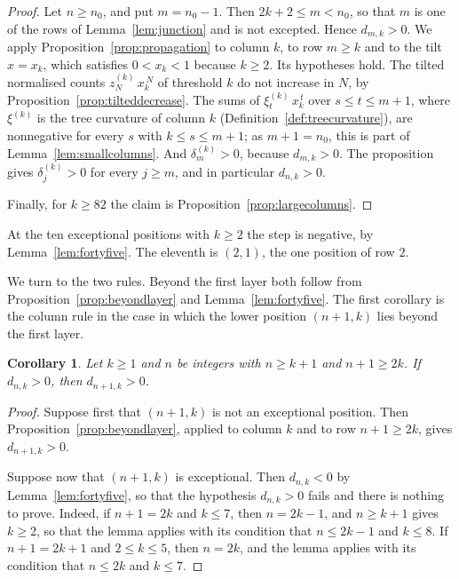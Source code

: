 \documentclass{amsart}
\newtheorem{corollary}[theorem]{Corollary}
\theoremstyle{definition}
\theoremstyle{remark}
\numberwithin{equation}{section}
\begin{document}
\begin{proof}
Let $n\ge n_0$, and put $m=n_0-1$. Then $2k+2\le m<n_0$, so that $m$ is one
of the rows of Lemma~\ref{lem:junction} and is not excepted. Hence
$d_{m,k}>0$. We apply
Proposition~\ref{prop:propagation} to column $k$, to row $m\ge k$
and to the tilt $x=x_k$, which satisfies $0<x_k<1$ because $k\ge2$. Its
hypotheses hold. The tilted normalised counts
$z^{(k)}_N\,x_k^{\,N}$ of threshold $k$ do not increase in $N$, by
Proposition~\ref{prop:tilteddecrease}. The sums of
$\xi^{(k)}_t\,x_k^{\,t}$ over $s\le t\le m+1$, where $\xi^{(k)}$ is the tree
curvature of column $k$ (Definition~\ref{def:treecurvature}), are
nonnegative for every $s$ with $k\le s\le m+1$; as $m+1=n_0$, this is part
of Lemma~\ref{lem:smallcolumns}. And $\delta^{(k)}_m>0$, because
$d_{m,k}>0$. The proposition gives $\delta^{(k)}_j>0$
for every $j\ge m$, and in particular $d_{n,k}>0$.

Finally, for $k\ge82$ the claim is
Proposition~\ref{prop:largecolumns}.
\end{proof}

At the ten exceptional positions with
$k\ge2$ the step is negative, by Lemma~\ref{lem:fortyfive}. The eleventh is
$(2,1)$, the one position of row $2$.

We turn to the two rules. Beyond the first layer both follow from
Proposition~\ref{prop:beyondlayer} and Lemma~\ref{lem:fortyfive}. The first
corollary is the column rule in the case in which the lower position
$(n+1,k)$ lies beyond the first layer.

\begin{corollary}\label{cor:columnbeyond}
Let $k\ge1$ and $n$ be integers with
$n\ge k+1$ and $n+1\ge2k$. If $d_{n,k}>0$, then $d_{n+1,k}>0$.
\end{corollary}

\begin{proof}
Suppose first that $(n+1,k)$ is not an exceptional position. Then
Proposition~\ref{prop:beyondlayer}, applied to column $k$ and to row
$n+1\ge2k$, gives $d_{n+1,k}>0$.

Suppose now that $(n+1,k)$ is exceptional. Then $d_{n,k}<0$ by
Lemma~\ref{lem:fortyfive}, so that the hypothesis $d_{n,k}>0$ fails and
there is nothing to prove. Indeed, if $n+1=2k$ and $k\le7$, then $n=2k-1$,
and $n\ge k+1$ gives $k\ge2$, so that the lemma applies with its condition
that $n\le2k-1$ and $k\le8$. If $n+1=2k+1$ and $2\le k\le5$, then $n=2k$,
and the lemma applies with its condition that $n\le2k$ and $k\le7$.
\end{proof}
\end{document}
